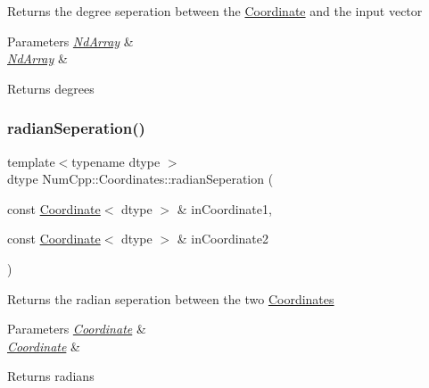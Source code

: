 Returns the degree seperation between the \mbox{\hyperlink{class_num_cpp_1_1_coordinates_1_1_coordinate}{Coordinate}} and the input vector


\begin{DoxyParams}{Parameters}
{\em \mbox{\hyperlink{class_num_cpp_1_1_nd_array}{Nd\+Array}}} & \\
\hline
{\em \mbox{\hyperlink{class_num_cpp_1_1_nd_array}{Nd\+Array}}} & \\
\hline
\end{DoxyParams}
\begin{DoxyReturn}{Returns}
degrees 
\end{DoxyReturn}
\mbox{\label{namespace_num_cpp_1_1_coordinates_a2c41aaaa5c660d3ec0d9ab23327f4d44}} 
\subsubsection{\texorpdfstring{radian\+Seperation()}{radianSeperation()}\hspace{0.1cm}{\footnotesize\ttfamily [1/2]}}
{\footnotesize\ttfamily template$<$typename dtype $>$ \\
dtype Num\+Cpp\+::\+Coordinates\+::radian\+Seperation (\begin{DoxyParamCaption}\item[{const \mbox{\hyperlink{class_num_cpp_1_1_coordinates_1_1_coordinate}{Coordinate}}$<$ dtype $>$ \&}]{in\+Coordinate1,  }\item[{const \mbox{\hyperlink{class_num_cpp_1_1_coordinates_1_1_coordinate}{Coordinate}}$<$ dtype $>$ \&}]{in\+Coordinate2 }\end{DoxyParamCaption})}

Returns the radian seperation between the two \mbox{\hyperlink{namespace_num_cpp_1_1_coordinates}{Coordinates}}


\begin{DoxyParams}{Parameters}
{\em \mbox{\hyperlink{class_num_cpp_1_1_coordinates_1_1_coordinate}{Coordinate}}} & \\
\hline
{\em \mbox{\hyperlink{class_num_cpp_1_1_coordinates_1_1_coordinate}{Coordinate}}} & \\
\hline
\end{DoxyParams}
\begin{DoxyReturn}{Returns}
radians 
\end{DoxyReturn}
\mbox{\label{namespace_num_cpp_1_1_coordinates_a1395767e51f62c2fa7d7106decf65172}} 

